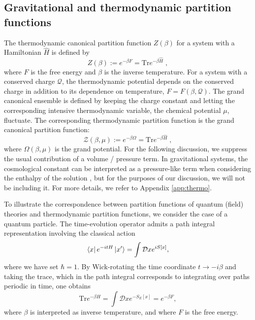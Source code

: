 \subsection{Gravitational and thermodynamic partition functions}

The thermodynamic canonical partition function $Z(\beta)$ for a system with a Hamiltonian $\hat{H}$ is defined by
\begin{equation*}
    Z(\beta) := e^{-\beta F}  = \textrm{Tr} e^{- \beta \hat{H}}\;,
\end{equation*}
where $F$ is the free energy and $\beta$ is the inverse temperature. For a system with a conserved charge $\mathcal{Q}$, the thermodynamic potential depends on the conserved charge in addition to its dependence on temperature, $F=F(\beta, \mathcal{Q})$. The grand canonical ensemble is defined by keeping the charge constant and letting the corresponding intensive thermodynamic variable, the chemical potential $\mu$, fluctuate. The corresponding thermodynamic partition function is the grand canonical partition function:
\begin{equation*}
    \mathcal{Z}(\beta, \mu) := e^{-\beta \Omega}  = \textrm{Tr} e^{- \beta \hat{H}}\;,
\end{equation*}
where $\Omega(\beta, \mu)$ is the grand potential. For the following discussion, we suppress the usual contribution of a volume / pressure term. In gravitational systems, the cosmological constant can be interpreted as a pressure-like term when considering the enthalpy of the solution \cite{Dolan:2011xt}, but for the purposes of our discussion, we will not be including it. For more details, we refer to Appendix \ref{app:thermo}.

To illustrate the correspondence between partition functions of quantum (field) theories and thermodynamic partition functions, we consider the case of a quantum particle. The
time-evolution operator admits a path integral representation involving the classical action
\begin{equation*}
    \bra{x} e^{-i t H} \ket{x'} = \int \mathcal{D} x e^{i S[x]},
\end{equation*}
where we have set $\hbar = 1$. 
By Wick-rotating the time coordinate $t \rightarrow -i\beta$ and taking the trace, which 
in the path integral corresponds to integrating over paths periodic in time, one obtains
\begin{equation*}
    \textrm{Tr} e^{ -\beta H}  = \int \mathcal{D} x e^{-S_E[x]} = e^{-\beta F},
\end{equation*}
where $\beta$ is interpreted as inverse temperature, and where $F$ is the free energy.


